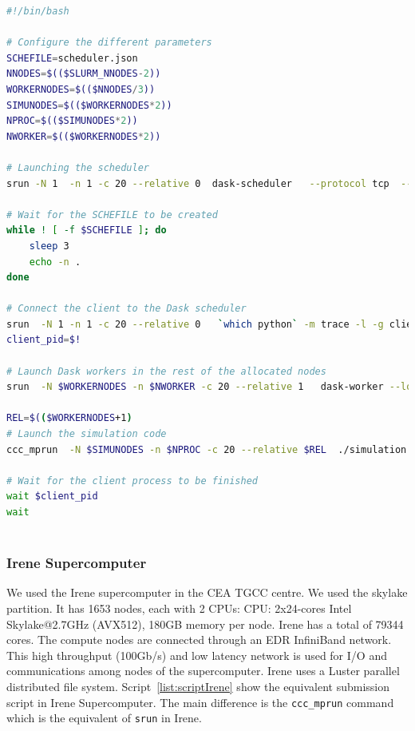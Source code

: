 \begin{lstlisting}[float=h!, label=list:script, language=bash, caption=Submission script of simulation and in situ analytics in Ruche supercomputer]
#!/bin/bash

# Configure the different parameters 
SCHEFILE=scheduler.json
NNODES=$(($SLURM_NNODES-2))
WORKERNODES=$(($NNODES/3))
SIMUNODES=$(($WORKERNODES*2))
NPROC=$(($SIMUNODES*2))                   
NWORKER=$(($WORKERNODES*2))

# Launching the scheduler 
srun -N 1  -n 1 -c 20 --relative 0  dask-scheduler   --protocol tcp  --scheduler-file=$SCHEFILE 1>> scheduler.o  2>> scheduler.e  &

# Wait for the SCHEFILE to be created 
while ! [ -f $SCHEFILE ]; do
    sleep 3
    echo -n .
done

# Connect the client to the Dask scheduler
srun  -N 1 -n 1 -c 20 --relative 0   `which python` -m trace -l -g client.py 1>> client.o 2>> client.e &
client_pid=$!

# Launch Dask workers in the rest of the allocated nodes 
srun  -N $WORKERNODES -n $NWORKER -c 20 --relative 1   dask-worker --local-directory /tmp  --scheduler-file=${SCHEFILE} 1>> worker.o 2>>worker.e  &
     
REL=$(($WORKERNODES+1)
# Launch the simulation code
ccc_mprun  -N $SIMUNODES -n $NPROC -c 20 --relative $REL  ./simulation 1>> simulation.o 2>> simulation.e &

# Wait for the client process to be finished 
wait $client_pid
wait 
       
\end{lstlisting}

\subsubsection{Irene Supercomputer}

We used the Irene supercomputer in the CEA TGCC centre. We used the skylake partition. It has 1653 nodes, each with 2 CPUs: CPU: 2x24-cores Intel Skylake@2.7GHz (AVX512), 180GB memory per node. Irene has a total of 79344 cores.  The compute nodes are connected through an EDR InfiniBand network. This high throughput (100Gb/s) and low latency network is used for I/O and communications among nodes of the supercomputer. Irene uses a Luster parallel distributed file system. Script~\ref{list:scriptIrene} show the equivalent submission script in Irene Supercomputer. The main difference is the \texttt{ccc\_mprun} command which is the equivalent of \texttt{srun} in Irene.  

